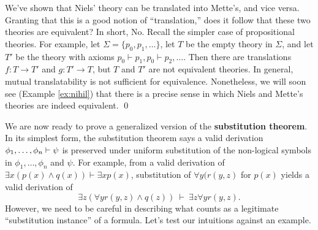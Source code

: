 \begin{disc} We've shown that Niels' theory can be translated into
  Mette's, and vice versa.  Granting that this is a good notion of
  ``translation,'' does it follow that these two theories are
  equivalent?  In short, No.  Recall the simpler case of propositional
  theories.  For example, let $\Sigma = \{ p_0,p_1,\dots \}$, let $T$
  be the empty theory in $\Sigma$, and let $T'$ be the theory with
  axioms $p_0\vdash p_1,p_0\vdash p_2,\dots $.  Then there are
  translations $f:T\to T'$ and $g:T'\to T$, but $T$ and $T'$ are not
  equivalent theories.  In general, mutual translatability is not
  sufficient for equivalence.  Nonetheless, we will soon see (Example
  \ref{ex:nihil}) that there is a precise sense in which Niels and
  Mette's theories are indeed equivalent.  \hfill \qed
\end{disc}

We are now ready to prove a generalized version of the
\textbf{substitution theorem}.  In its simplest form, the substitution
theorem says a valid derivation $\phi _1,\dots ,\phi_n\vdash \psi$ is
preserved under uniform substitution of the non-logical symbols in
$\phi _1,\dots ,\phi _n$ and $\psi$.  For example, from a valid
derivation of $\exists x(p(x)\wedge q(x))\vdash \exists x p(x)$,
substitution of $\forall y(r(y,z)$ for $p(x)$ yields a valid
derivation of
\[ \exists z(\forall yr(y,z)\wedge q(z)) \: \vdash \: \exists z\forall
  yr(y,z) .\] However, we need to be careful in describing what counts
as a legitimate ``substitution instance'' of a formula.  Let's test
our intuitions against an example.

